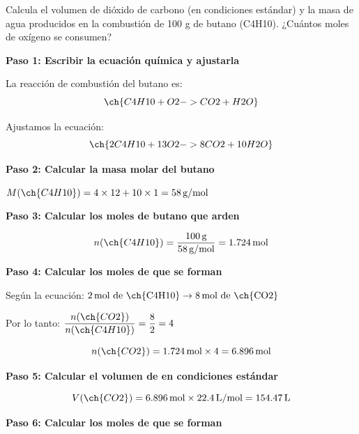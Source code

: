 \begin{exercise}
    Calcula el volumen de dióxido de carbono (en condiciones estándar) y la masa de agua producidos en la combustión de 100 g de butano (C4H10).
    ¿Cuántos moles de oxígeno se consumen?
    \begin{solu}
        \textbf{Paso 1: Escribir la ecuación química y ajustarla}

        La reacción de combustión del butano es:
        \begin{equation*}
            \ch{C4H10 + O2 -> CO2 + H2O}
        \end{equation*}

        Ajustamos la ecuación:
        \begin{equation*}
            \ch{2 C4H10 + 13 O2 -> 8 CO2 + 10 H2O}
        \end{equation*}

        \textbf{Paso 2: Calcular la masa molar del butano}

        $M(\ch{C4H10}) = 4 \times 12 + 10 \times 1 = 58\,\text{g/mol}$

        \textbf{Paso 3: Calcular los moles de butano que arden}

        \begin{equation*}
            n(\ch{C4H10}) = \frac{100\,\text{g}}{58\,\text{g/mol}} = 1.724\,\text{mol}
        \end{equation*}

        \textbf{Paso 4: Calcular los moles de  que se forman}

        Según la ecuación: $2\,\text{mol de \ch{C4H10}} \rightarrow 8\,\text{mol de \ch{CO2}}$

        Por lo tanto: $\dfrac{n(\ch{CO2})}{n(\ch{C4H10})} = \dfrac{8}{2} = 4$

        \begin{equation*}
            n(\ch{CO2}) = 1.724\,\text{mol} \times 4 = 6.896\,\text{mol}
        \end{equation*}

        \textbf{Paso 5: Calcular el volumen de  en condiciones estándar}

        \begin{equation*}
            V(\ch{CO2}) = 6.896\,\text{mol} \times 22.4\,\text{L/mol} = 154.47\,\text{L}
        \end{equation*}

        \textbf{Paso 6: Calcular los moles de  que se forman}


\end{solu}
\end{exercise}
